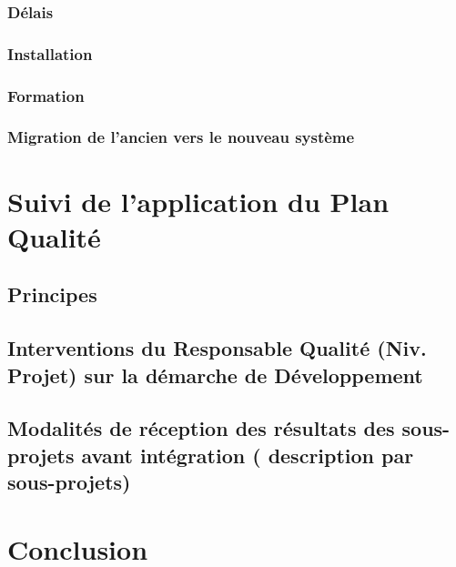 \subsubsection{Délais}
\subsubsection{Installation}
\subsubsection{Formation}
\subsubsection{Migration de l’ancien vers le nouveau système}

\section{Suivi de l’application du Plan Qualité}
\subsection{Principes}
\subsection{Interventions du Responsable Qualité (Niv. Projet) sur la démarche de Développement}
\subsection{Modalités de réception des résultats des sous-projets avant intégration	( description par sous-projets)}

\section{Conclusion}

